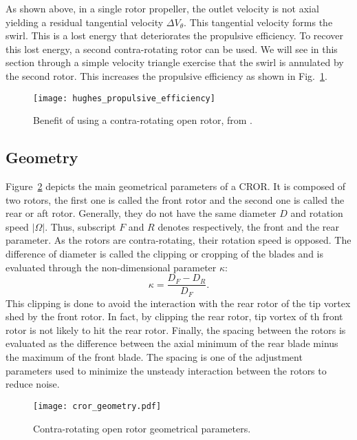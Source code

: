 
As shown above, in a single rotor propeller, the outlet velocity is not axial
yielding a residual tangential velocity $\Delta V_{\theta}$. 
This tangential velocity forms the swirl. 
This is a lost energy that deteriorates the propulsive efficiency. 
To recover this lost energy, a second contra-rotating rotor can be used.
We will see in this section through a simple velocity triangle exercise that
the swirl is annulated by the second rotor. This increases the propulsive
efficiency as shown in Fig.~\ref{fig:hughes_propulsive_efficiency}.
\begin{figure}[htb]
  \centering
  \texttt{[image: hughes\_propulsive\_efficiency]}
  \caption{Benefit of using a contra-rotating open rotor, from \citet{Hughes1989}.}
  \label{fig:hughes_propulsive_efficiency}
\end{figure}

\subsection{Geometry}
\label{sub:cror_geometry}

Figure~\ref{fig:cror_geometry} depicts the main
geometrical parameters of a CROR.
It is composed of two rotors, the first one is called
the front rotor and the second one is called the rear or aft rotor.
Generally, they do not have the same diameter $D$ and rotation speed
$| \Omega |$. Thus, subscript $F$ and $R$ denotes respectively,
the front and the rear parameter.
As the rotors are contra-rotating, their rotation speed is opposed.
The difference of diameter is called the clipping or cropping
of the blades and is evaluated through the non-dimensional parameter
$\kappa$:
\begin{equation}
    \kappa = \frac{D_F - D_R}{D_F}.
\end{equation}
This clipping is done to avoid the interaction 
with the rear rotor of the tip vortex shed
by the front rotor. In fact, by clipping the rear
rotor, tip vortex of th front rotor is not likely
to hit the rear rotor.
Finally, the spacing between the rotors
is evaluated as the difference between the axial minimum of the
rear blade minus the maximum of the front blade. The spacing
is one of the adjustment parameters used to minimize the unsteady
interaction between the rotors to reduce noise.
\begin{figure}[htbp]
  \centering
  \texttt{[image: cror\_geometry.pdf]}
  \caption{Contra-rotating open rotor geometrical parameters.}
  \label{fig:cror_geometry}
\end{figure}


